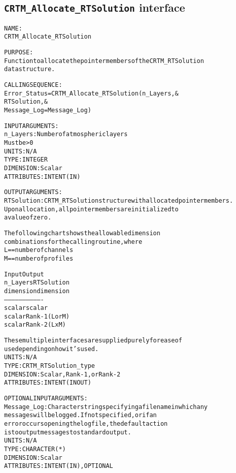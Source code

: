 \subsection{\texttt{CRTM\_Allocate\_RTSolution} interface}
  \label{sec:CRTM_Allocate_RTSolution_interface}
  \begin{alltt}
 
  NAME:
        CRTM_Allocate_RTSolution
  
  PURPOSE:
        Function to allocate the pointer members of the CRTM_RTSolution
        data structure.
 
  CALLING SEQUENCE:
        Error_Status = CRTM_Allocate_RTSolution( n_Layers               , &
                                                 RTSolution             , &
                                                 Message_Log=Message_Log  )
 
  INPUT ARGUMENTS:
        n_Layers:     Number of atmospheric layers 
                      Must be > 0
                      UNITS:      N/A
                      TYPE:       INTEGER
                      DIMENSION:  Scalar
                      ATTRIBUTES: INTENT(IN)
 
  OUTPUT ARGUMENTS:
        RTSolution:   CRTM_RTSolution structure with allocated pointer members.
                      Upon allocation, all pointer members are initialized to
                      a value of zero.
 
                      The following chart shows the allowable dimension
                      combinations for the calling routine, where
                        L == number of channels
                        M == number of profiles
 
                         Input           Output
                        n_Layers       RTSolution
                        dimension      dimension
                      -------------------------------
                         scalar         scalar
                         scalar      Rank-1 (L or M)
                         scalar      Rank-2 (L x M)
 
                      These multiple interfaces are supplied purely for ease of
                      use depending on how it's used.
                      UNITS:      N/A
                      TYPE:       CRTM_RTSolution_type
                      DIMENSION:  Scalar, Rank-1, or Rank-2
                      ATTRIBUTES: INTENT(IN OUT)
 
  OPTIONAL INPUT ARGUMENTS:
        Message_Log:  Character string specifying a filename in which any
                      messages will be logged. If not specified, or if an
                      error occurs opening the log file, the default action
                      is to output messages to standard output.
                      UNITS:      N/A
                      TYPE:       CHARACTER(*)
                      DIMENSION:  Scalar
                      ATTRIBUTES: INTENT(IN), OPTIONAL
 

\end{alltt}
